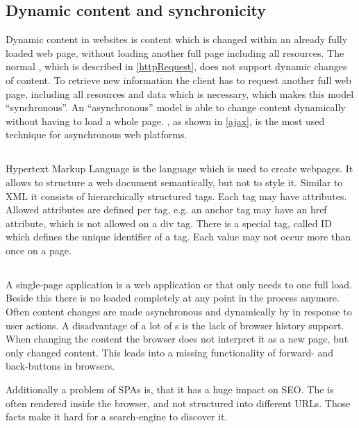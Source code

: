 \subsection{Dynamic content and synchronicity\label{synchronicity}}
Dynamic content in websites is content which is changed within an already fully loaded web page, without loading another full page including all resources. The normal \httpRequest{}, which is described in \ref{httpRequest}, does not support dynamic changes of content. To retrieve new information the client has to request another full web page, including all resources and data which is necessary, which makes this model \enquote{synchronous}.
An \enquote{asynchronous} model is able to change content dynamically without having to load a whole page. \ajax{}, as shown in \ref{ajax}, is the most used technique for asynchronous web platforms.

\subsection{\html{}\label{html}}
Hypertext Markup Language is the language which is used to create webpages.
It allows to structure a web document semantically, but not to style it.
Similar to XML it consists of hierarchically structured tags.
Each tag may have attributes.
Allowed attributes are defined per tag, e.g. an anchor tag may have an href attribute, which is not allowed on a div tag.
There is a special tag, called ID which defines the unique identifier of a tag.
Each value may not occur more than once on a page.

\subsection{\SinglePageApplication{}\label{singlePageAppliacation}}
A single-page application is a web application or \webSite{} that only needs to one full \webPage{} load.
Beside this there is no \webPage{} loaded completely at any point in the process anymore.
Often content changes are made asynchronous and dynamically by \ajax{} in response to user actions.
A disadvantage of a lot of \singlePageApplication{}s is the lack of browser history support.
When changing the content the browser does not interpret it as a new page, but only changed content.
This leads into a missing functionality of forward- and back-buttons in browsers.

Additionally a problem of SPAs is, that it has a huge impact on SEO.
The \webPage{} is often rendered inside the browser, and not structured into different URLs.
Those facts make it hard for a search-engine to discover it.

